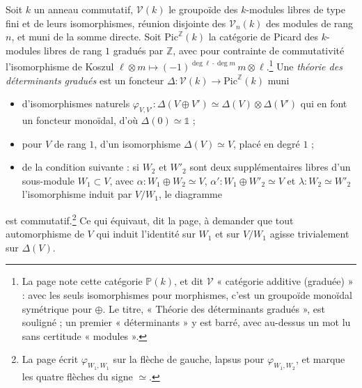 \documentclass[11pt,a4paper]{article}
\begin{document}
Soit $k$ un anneau commutatif, $\mathcal{V}(k)$ le groupoïde des $k$-modules
libres de type fini et de leurs isomorphismes, réunion disjointe des
$\mathcal{V}_n(k)$ des modules de rang $n$, et muni de la somme directe. Soit
$\mathrm{Pic}^{\mathbb{Z}}(k)$ la catégorie de Picard des $k$-modules libres
de rang $1$ gradués par $\mathbb{Z}$, avec pour contrainte de commutativité
l'isomorphisme de Koszul
$\ell \otimes m \mapsto (-1)^{\deg \ell \cdot \deg m}\, m \otimes
\ell$.\footnote{La page note cette catégorie $\mathbb{P}(k)$, et dit
$\mathcal{V}$ « catégorie additive (graduée) » : avec les seuls
isomorphismes pour morphismes, c'est un groupoïde monoïdal symétrique pour
$\oplus$. Le titre, « Théorie des déterminants gradués », est souligné ; un
premier « déterminants » y est barré, avec au-dessus un mot lu sans
certitude « modules ».} Une \emph{théorie des déterminants gradués} est un
foncteur $\Delta : \mathcal{V}(k) \to \mathrm{Pic}^{\mathbb{Z}}(k)$ muni
\begin{itemize}
  \item[a)] d'isomorphismes naturels
  $\varphi_{V,V'} : \Delta(V \oplus V') \simeq \Delta(V) \otimes \Delta(V')$
  qui en font un foncteur monoïdal, d'où $\Delta(0) \simeq \mathbb{1}$ ;
  \item[b)] pour $V$ de rang $1$, d'un isomorphisme $\Delta(V) \simeq V$,
  placé en degré $1$ ;
  \item[c)] de la condition suivante : si $W_2$ et $W'_2$ sont deux
  supplémentaires libres d'un sous-module $W_1 \subset V$, avec
  $\alpha : W_1 \oplus W_2 \simeq V$, $\alpha' : W_1 \oplus W'_2 \simeq V$ et
  $\lambda : W_2 \simeq W'_2$ l'isomorphisme induit par $V/W_1$, le
  diagramme
\end{itemize}


est commutatif.\footnote{La page écrit $\varphi_{W_1, W_1}$ sur la flèche de
gauche, lapsus pour $\varphi_{W_1, W_2}$, et marque les quatre flèches du
signe $\simeq$.} Ce qui équivaut, dit la page, à demander que tout
automorphisme de $V$ qui induit l'identité sur $W_1$ et sur $V/W_1$ agisse
trivialement sur $\Delta(V)$.
\end{document}
